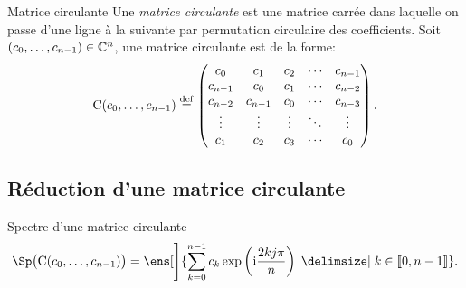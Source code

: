 \begin{defi}{Matrice circulante}
Une \emph{matrice circulante} est une matrice carrée dans laquelle on passe d'une ligne à la suivante par permutation circulaire des coefficients. Soit $(c_0, \dots, c_{n-1}) \in \mathbb{C}^n$, une matrice circulante est de la forme:
$$
\mathrm{C}(c_0, \dots, c_{n-1}) \overset{\mathrm{\tiny def}}{=}
\begin{pmatrix}
c_0 & c_1 & c_2 & \cdots & c_{n-1} \\
c_{n-1} & c_0 & c_1 & \cdots & c_{n-2} \\
c_{n-2} & c_{n-1} & c_0 & \cdots & c_{n-3} \\
\vdots & \vdots & \vdots & \ddots & \vdots \\
c_1 & c_2 & c_3 & \cdots & c_0
\end{pmatrix}.
$$
\end{defi}

\subsection{Réduction d'une matrice circulante}

\begin{prop}{Spectre d'une matrice circulante}
    $$\Sp \big( \mathrm{C}(c_0, \dots, c_{n-1}) \big) = \ens[\Bigg]{ \sum_{k=0}^{n-1} c_k \exp \left( \i \frac{2kj \pi}{n} \right) \tq k \in \llbracket 0, n-1 \rrbracket }.$$
\end{prop}

